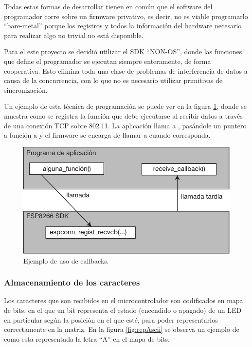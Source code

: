 Todas estas formas de desarrollar tienen en común que el software del programador corre sobre un firmware privativo, es decir, no es viable programarlo \enquote{bare-metal} porque los registros y todos la información del hardware necesario para realizar algo no trivial no está disponible.

Para el este proyecto se decidió utilizar el SDK \enquote{NON-OS}, donde las funciones que define el programador se ejecutan siempre enteramente, de forma cooperativa. Esto elimina toda una clase de problemas de interferencia de datos a causa de la concurrencia, con lo que no es necesario utilizar primitivas de sincronización.

Un ejemplo de esta técnica de programación se puede ver en la figura \ref{fig:callbacks}, donde se muestra como se registra la función que debe ejecutarse al recibir datos a través de una conexión TCP sobre 802.11. La aplicación llama a , pasándole un puntero a función a  y el firmware se encarga de llamar a  cuando corresponda.

\begin{figure}[ht!]
	\begin{center}
		\centering
		\includegraphics[scale=0.8]{imagenes/callbacks.pdf}
		\caption{Ejemplo de uso de callbacks.}
		\label{fig:callbacks}
	\end{center}
\end{figure}

\subsubsection{Almacenamiento de los caracteres}

Los caracteres que son recibidos en el microcontrolador son codificados en mapa de bits, en el que un bit representa el estado (encendido o apagado) de un LED en particular según la posición en el que esté, para poder representarlos correctamente en la matriz. En la figura \ref{fig:repAscii} se observa un ejemplo de como esta representada la letra \enquote{A} en el mapa de bits.

